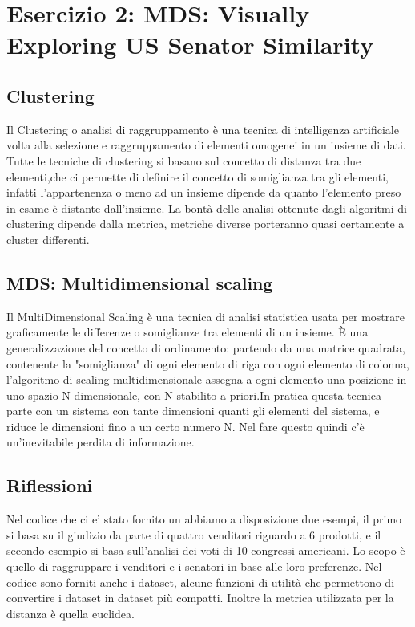 	\section{Esercizio 2: MDS: Visually Exploring US Senator Similarity}
		\label{sec:es2}
			\subsection{Clustering}
				Il Clustering o analisi di raggruppamento è una tecnica di intelligenza artificiale volta alla selezione e raggruppamento di elementi omogenei in un insieme di dati. Tutte le tecniche di clustering si basano sul concetto di distanza tra due elementi,che ci permette di definire il concetto di somiglianza tra gli elementi, infatti l'appartenenza o meno ad un insieme dipende da quanto l'elemento preso in esame è distante dall'insieme. La bontà delle analisi ottenute dagli algoritmi di clustering dipende dalla metrica, metriche diverse porteranno quasi certamente a cluster differenti.
				
			\subsection{MDS: Multidimensional scaling}
				Il MultiDimensional Scaling è una tecnica di analisi statistica usata per mostrare graficamente le differenze o somiglianze tra elementi di un insieme.   È una generalizzazione del concetto di ordinamento: partendo da una matrice quadrata, contenente la "somiglianza" di ogni elemento di riga con ogni elemento di colonna, l'algoritmo di scaling multidimensionale assegna a ogni elemento una posizione in uno spazio N-dimensionale, con N stabilito a priori.In pratica questa tecnica parte con un sistema con tante dimensioni quanti gli elementi del sistema, e riduce le dimensioni fino a un certo numero N. Nel fare questo quindi c'è un'inevitabile perdita di informazione.
			\subsection{Riflessioni }		
				Nel codice che ci e' stato fornito un abbiamo a disposizione due esempi, il primo si basa su il giudizio da parte di quattro venditori riguardo a 6 prodotti, e il secondo esempio si basa sull'analisi dei voti di 10 congressi americani.
				Lo scopo è quello di raggruppare i venditori e i senatori in base alle loro preferenze.
				Nel codice sono forniti anche i dataset, alcune funzioni di utilità che permettono di convertire i dataset in dataset più compatti.
				Inoltre la metrica utilizzata per la distanza è quella euclidea.
				
